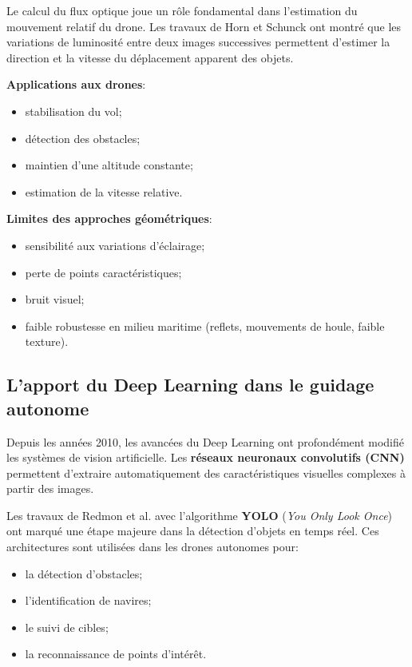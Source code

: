 \documentclass[12pt, a4paper, twoside, openright]{report}
\begin{document}
Le calcul du flux optique joue un rôle fondamental dans l’estimation du mouvement relatif du drone. Les travaux de Horn et Schunck \cite{horn1981determining} ont montré que les variations de luminosité entre deux images successives permettent d’estimer la direction et la vitesse du déplacement apparent des objets.

\textbf{Applications aux drones}:
\begin{itemize}
    \item stabilisation du vol;
    \item détection des obstacles;
    \item maintien d’une altitude constante;
    \item estimation de la vitesse relative.
\end{itemize}

\textbf{Limites des approches géométriques}:
\begin{itemize}
    \item sensibilité aux variations d’éclairage;
    \item perte de points caractéristiques;
    \item bruit visuel;
    \item faible robustesse en milieu maritime (reflets, mouvements de houle, faible texture).
\end{itemize}

\subsection{L’apport du Deep Learning dans le guidage autonome}
Depuis les années 2010, les avancées du Deep Learning ont profondément modifié les systèmes de vision artificielle. Les \textbf{réseaux neuronaux convolutifs (CNN)} permettent d’extraire automatiquement des caractéristiques visuelles complexes à partir des images.

Les travaux de Redmon et al. avec l’algorithme \textbf{YOLO} (\textit{You Only Look Once}) \cite{redmon2016you} ont marqué une étape majeure dans la détection d’objets en temps réel. Ces architectures sont utilisées dans les drones autonomes pour:
\begin{itemize}
    \item la détection d’obstacles;
    \item l’identification de navires;
    \item le suivi de cibles;
    \item la reconnaissance de points d’intérêt.
\end{itemize}
\end{document}
